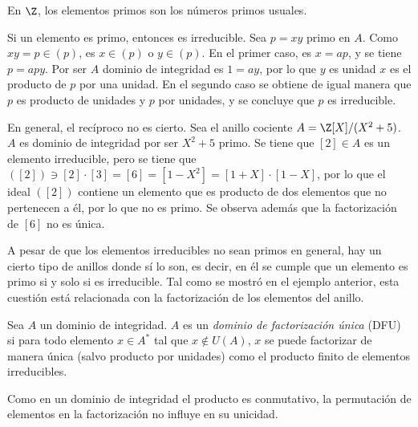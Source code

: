 \begin{obss}
        \item En $\Z$, los elementos primos son los números primos usuales.
        \item Si un elemento es primo, entonces es irreducible. Sea $p = xy$ primo en $A$. Como $xy = p \in (p)$, es $x\in (p)$ o $y\in (p)$. En el primer caso, es $x = ap$, y se tiene $p = apy$. Por ser $A$ dominio de integridad es $1 = ay$, por lo que $y$ es unidad $x$ es el producto de $p$ por una unidad. En el segundo caso se obtiene de igual manera que $p$ es producto de unidades y $p$ por unidades, y se concluye que $p$ es irreducible.
        \item En general, el recíproco no es cierto. Sea el anillo cociente $ A = \Z[X]/(X^2 + 5)$. $A$ es dominio de integridad por ser $X^2 + 5$ primo. Se tiene que $[2]\in A$ es un elemento irreducible, pero se tiene que $([2])\ni [2]\cdot[3] =[6] = [1-X^2] = [1 + X]\cdot [1-X]$, por lo que el ideal $([2])$ contiene un elemento que es producto de dos elementos que no pertenecen a él, por lo que no es primo. Se observa además que la factorización de $[6]$ no es única.
\end{obss}

    A pesar de que los elementos irreducibles no sean primos en general, hay un cierto tipo de anillos donde sí lo son, es decir, en él se cumple que un elemento es primo si y solo si es irreducible. Tal como se mostró en el ejemplo anterior, esta cuestión está relacionada con la factorización de los elementos del anillo.

\begin{deff}{\cite[p.~37]{Rosenberger}}
    Sea $A$ un dominio de integridad. $A$ es un \textit{dominio de factorización única} (DFU) si para todo elemento $x\in A^*$ tal que $x\not\in U(A)$, $x$ se puede factorizar de manera única (salvo producto por unidades) como el producto finito de elementos irreducibles.
\end{deff}

\begin{obs}
    Como en un dominio de integridad el producto es conmutativo, la permutación de elementos en la factorización no influye en su unicidad.
\end{obs}

